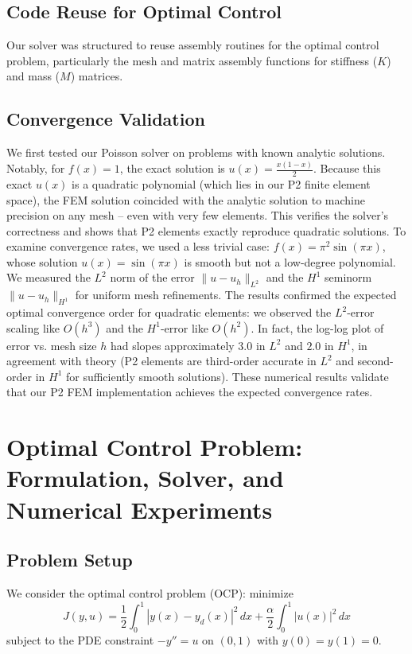 \documentclass{article}
\begin{document}
\subsection{Code Reuse for Optimal Control}
Our solver was structured to reuse assembly routines for the optimal control problem, particularly the mesh and matrix assembly functions for stiffness ($K$) and mass ($M$) matrices.

\subsection{Convergence Validation}
We first tested our Poisson solver on problems with known analytic solutions. Notably, for $f(x)=1$, the exact solution is $u(x)=\frac{x(1-x)}{2}$. Because this exact $u(x)$ is a quadratic polynomial (which lies in our P2 finite element space), the FEM solution coincided with the analytic solution to machine precision on any mesh – even with very few elements. This verifies the solver’s correctness and shows that P2 elements exactly reproduce quadratic solutions. To examine convergence rates, we used a less trivial case: $f(x)=\pi^2\sin(\pi x)$, whose solution $u(x)=\sin(\pi x)$ is smooth but not a low-degree polynomial. We measured the $L^2$ norm of the error $\|u - u_h\|_{L^2}$ and the $H^1$ seminorm $\|u - u_h\|_{H^1}$ for uniform mesh refinements. The results confirmed the expected optimal convergence order for quadratic elements: we observed the $L^2$-error scaling like $O(h^3)$ and the $H^1$-error like $O(h^2)$. In fact, the log-log plot of error vs. mesh size $h$ had slopes approximately $3.0$ in $L^2$ and $2.0$ in $H^1$, in agreement with theory (P2 elements are third-order accurate in $L^2$ and second-order in $H^1$ for sufficiently smooth solutions). These numerical results validate that our P2 FEM implementation achieves the expected convergence rates.

\section{Optimal Control Problem: Formulation, Solver, and Numerical Experiments}

\subsection{Problem Setup}
We consider the optimal control problem (OCP): minimize
\begin{equation}
J(y,u) = \frac{1}{2}\int_0^1 |y(x)-y_d(x)|^2\,dx + \frac{\alpha}{2}\int_0^1 |u(x)|^2\,dx
\end{equation}
subject to the PDE constraint $-y'' = u$ on $(0,1)$ with $y(0)=y(1)=0$.
\end{document}
